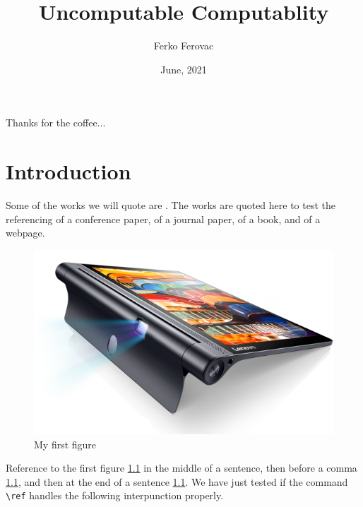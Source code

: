 \documentclass[bachelorthesis]{fer}
\title{Uncomputable Computablity}
\author{Ferko Ferovac}
\date{June, 2021}
\begin{document}
\maketitle






\begin{zahvale}
  Thanks for the coffee...
\end{zahvale}


\mainmatter


\tableofcontents


\chapter{Introduction}
\label{chp:introduction}

Some of the works we will quote are \cite{6248073,6247753,ghiglia_pritt_phase_unwrapping,hartley2003multiple,4250461,123DCatch}.
The works are quoted here to test the referencing of a conference paper, of a journal paper, of a book, and of a webpage.

\begin{figure}[htb]
  \centering
  \includegraphics[width=0.38\linewidth]{Figures/lenovo_yoga_tab3_pro_front.png} 
  \caption{My first figure}
  \label{fig:firstfigure}
\end{figure}

Reference to the first figure \ref{fig:firstfigure} in the middle of a sentence, then before a comma \ref{fig:firstfigure}, and then at the end of a sentence \ref{fig:firstfigure}.
We have just tested if the command \verb|\ref| handles the following interpunction properly.
\end{document}
